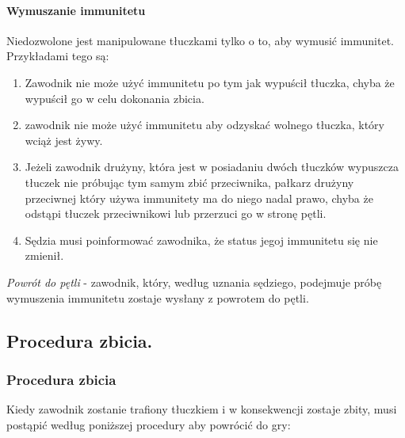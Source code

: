 \documentclass[12pt]{article}
\begin{document}
\paragraph{Wymuszanie immunitetu}
Niedozwolone jest manipulowane
tłuczkami tylko o to, aby wymusić immunitet. Przykładami tego są:

\begin{enumerate}
\item
    Zawodnik nie może użyć immunitetu po tym jak wypuścił tłuczka, chyba
  że wypuścił go w celu dokonania zbicia.
  \item
  zawodnik nie może użyć immunitetu aby odzyskać wolnego tłuczka, który
  wciąż jest żywy.
\item
  Jeżeli zawodnik drużyny, która jest w posiadaniu dwóch tłuczków
  wypuszcza tłuczek nie próbując tym samym zbić przeciwnika, pałkarz
  drużyny przeciwnej który używa immunitety ma do niego nadal prawo,
  chyba że odstąpi tłuczek przeciwnikowi lub przerzuci go w stronę
  pętli.
\item
  Sędzia musi poinformować zawodnika, że status jegoj immunitetu się nie
  zmienił.
\end{enumerate}

\emph{Powrót do pętli} - zawodnik, który, według uznania sędziego,
podejmuje próbę wymuszenia immunitetu zostaje wysłany z powrotem do
pętli.

\subsection{Procedura zbicia.}

\subsubsection{Procedura zbicia}

Kiedy zawodnik zostanie trafiony tłuczkiem i w konsekwencji zostaje
zbity, musi postąpić według poniższej procedury aby powrócić do gry:
\end{document}
